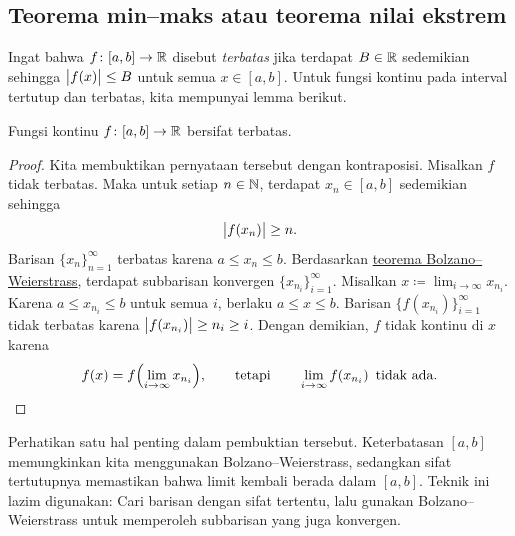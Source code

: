 \subsection{Teorema min--maks atau teorema nilai ekstrem}

Ingat bahwa $f \colon [a,b] \to {\mathbb{R}}$ disebut
\emph{terbatas}
jika terdapat $B \in {\mathbb{R}}$ sedemikian sehingga
$\bigl\lvert {f(x)} \bigr\rvert \leq B$ untuk semua $x \in [a,b]$.
Untuk fungsi kontinu pada interval tertutup dan terbatas, kita mempunyai lemma berikut.

\begin{lemma}
Fungsi kontinu $f \colon [a,b] \to {\mathbb{R}}$ bersifat terbatas.
\end{lemma}

\begin{proof}
Kita membuktikan pernyataan tersebut dengan kontraposisi.  Misalkan $f$ tidak terbatas.
Maka untuk setiap
$n \in {\mathbb{N}}$, terdapat $x_n \in [a,b]$ sedemikian sehingga
\begin{equation*}
\bigl\lvert {f(x_n)} \bigr\rvert \geq n .
\end{equation*}
Barisan $\{ x_n \}_{n=1}^\infty$ terbatas karena $a \leq x_n \leq b$.
Berdasarkan \hyperref[thm:bwseq]{teorema Bolzano--Weierstrass},
terdapat subbarisan konvergen $\{ x_{n_i} \}_{i=1}^\infty$.
Misalkan $x \coloneqq \lim_{i\to\infty} x_{n_i}$.
Karena $a \leq x_{n_i} \leq b$ untuk semua $i$, berlaku $a \leq x \leq b$.
Barisan $\bigl\{ f(x_{n_i}) \bigr\}_{i=1}^\infty$ tidak terbatas
karena
$\bigl\lvert {f(x_{n_i})} \bigr\rvert \geq n_i \geq i$.
Dengan demikian, $f$ tidak kontinu di $x$ karena
\begin{equation*}
f(x)
=
f\Bigl( \lim_{i\to\infty} x_{n_i} \Bigr) ,
\qquad \text{tetapi} \qquad
\lim_{i\to\infty} f(x_{n_i}) \enspace \text{tidak ada.} \qedhere
\end{equation*}
\end{proof}

Perhatikan satu hal penting dalam pembuktian tersebut.
Keterbatasan $[a,b]$ memungkinkan kita menggunakan Bolzano--Weierstrass,
sedangkan sifat tertutupnya memastikan bahwa limit kembali berada dalam $[a,b]$.
Teknik ini lazim digunakan: Cari barisan dengan sifat tertentu,
lalu gunakan Bolzano--Weierstrass untuk memperoleh subbarisan yang juga konvergen.

